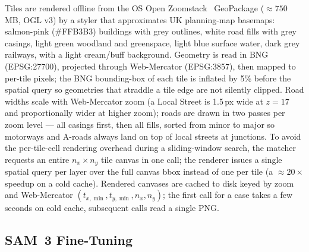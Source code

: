 \documentclass[11pt]{article}
\begin{document}
Tiles are rendered offline from the OS Open Zoomstack~\cite{os_open_zoomstack} GeoPackage ($\approx 750$\,MB, OGL v3) by a styler that approximates UK planning-map basemaps: salmon-pink (\#FFB3B3) buildings with grey outlines, white road fills with grey casings, light green woodland and greenspace, light blue surface water, dark grey railways, with a light cream/buff background. Geometry is read in BNG (EPSG:27700), projected through Web-Mercator (EPSG:3857), then mapped to per-tile pixels; the BNG bounding-box of each tile is inflated by 5\% before the spatial query so geometries that straddle a tile edge are not silently clipped. Road widths scale with Web-Mercator zoom (a Local Street is 1.5\,px wide at $z=17$ and proportionally wider at higher zoom); roads are drawn in two passes per zoom level --- all casings first, then all fills, sorted from minor to major so motorways and A-roads always land on top of local streets at junctions. To avoid the per-tile-cell rendering overhead during a sliding-window search, the matcher requests an entire $n_x \times n_y$ tile canvas in one call; the renderer issues a single spatial query per layer over the full canvas bbox instead of one per tile (a $\approx 20\times$ speedup on a cold cache). Rendered canvases are cached to disk keyed by zoom and Web-Mercator $(t_{x,\min}, t_{y,\min}, n_x, n_y)$; the first call for a case takes a few seconds on cold cache, subsequent calls read a single PNG.

\subsection{SAM~3 Fine-Tuning}
\label{subsection:sam3-finetune}
\end{document}
